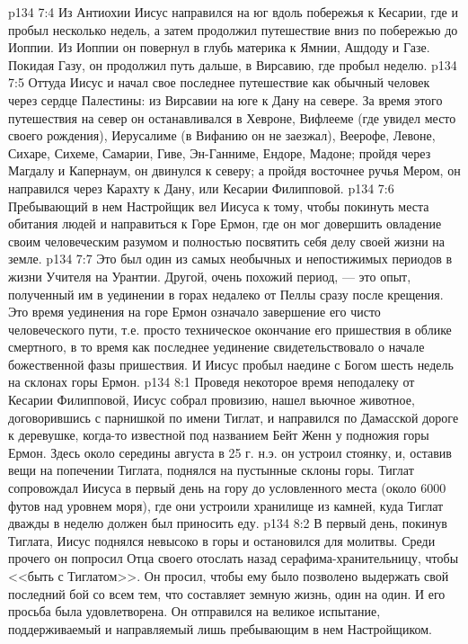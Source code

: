 \vs p134 7:4 Из Антиохии Иисус направился на юг вдоль побережья к Кесарии, где и пробыл несколько недель, а затем продолжил путешествие вниз по побережью до Иоппии. Из Иоппии он повернул в глубь материка к Ямнии, Ашдоду и Газе. Покидая Газу, он продолжил путь дальше, в Вирсавию, где пробыл неделю.
\vs p134 7:5 Оттуда Иисус и начал свое последнее путешествие как обычный человек через сердце Палестины: из Вирсавии на юге к Дану на севере. За время этого путешествия на север он останавливался в Хевроне, Вифлееме (где увидел место своего рождения), Иерусалиме (в Вифанию он не заезжал), Веерофе, Левоне, Сихаре, Сихеме, Самарии, Гиве, Эн\hyp{}Ганниме, Ендоре, Мадоне; пройдя через Магдалу и Капернаум, он двинулся к северу; а пройдя восточнее ручья Мером, он направился через Карахту к Дану, или Кесарии Филипповой.
\vs p134 7:6 Пребывающий в нем Настройщик вел Иисуса к тому, чтобы покинуть места обитания людей и направиться к Горе Ермон, где он мог довершить овладение своим человеческим разумом и полностью посвятить себя делу своей жизни на земле.
\vs p134 7:7 Это был один из самых необычных и непостижимых периодов в жизни Учителя на Урантии. Другой, очень похожий период, --- это опыт, полученный им в уединении в горах недалеко от Пеллы сразу после крещения. Это время уединения на горе Ермон означало завершение его чисто человеческого пути, т.е. просто техническое окончание его пришествия в облике смертного, в то время как последнее уединение свидетельствовало о начале божественной фазы пришествия. И Иисус пробыл наедине с Богом шесть недель на склонах горы Ермон.
\vs p134 8:1 Проведя некоторое время неподалеку от Кесарии Филипповой, Иисус собрал провизию, нашел вьючное животное, договорившись с парнишкой по имени Тиглат, и направился по Дамасской дороге к деревушке, когда\hyp{}то известной под названием Бейт Женн у подножия горы Ермон. Здесь около середины августа в 25 г. н.э. он устроил стоянку, и, оставив вещи на попечении Тиглата, поднялся на пустынные склоны горы. Тиглат сопровождал Иисуса в первый день на гору до условленного места (около 6000 футов над уровнем моря), где они устроили хранилище из камней, куда Тиглат дважды в неделю должен был приносить еду.
\vs p134 8:2 В первый день, покинув Тиглата, Иисус поднялся невысоко в горы и остановился для молитвы. Среди прочего он попросил Отца своего отослать назад серафима\hyp{}хранительницу, чтобы <<быть с Тиглатом>>. Он просил, чтобы ему было позволено выдержать свой последний бой со всем тем, что составляет земную жизнь, один на один. И его просьба была удовлетворена. Он отправился на великое испытание, поддерживаемый и направляемый лишь пребывающим в нем Настройщиком.
